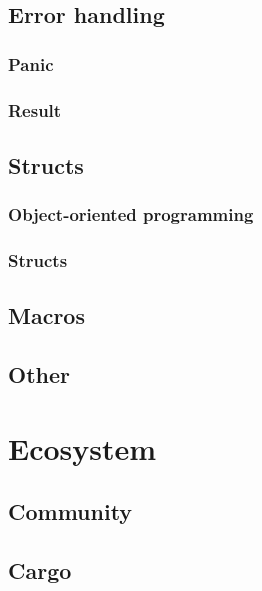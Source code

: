 \documentclass[%
final,
xcolor = table,
usenames,
dvipsnames,
table,
aspectratio = 169]{beamer}
\begin{document}
\subsection{Error handling}


\subsubsection{Panic}


\subsubsection{Result}


\subsection{Structs}

\subsubsection{Object-oriented programming}


\subsubsection{Structs}


\subsection{Macros}


\subsection{Other}



\section{Ecosystem}

\subsection{Community}


\subsection{Cargo}

\end{document}
